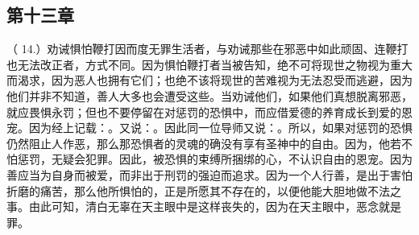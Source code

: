 
\subsection{第十三章}

\par

（ 14.）劝诫惧怕鞭打因而度无罪生活者，与劝诫那些在邪恶中如此顽固、连鞭打也无法改正者，方式不同。因为惧怕鞭打者当被告知，绝不可将现世之物视为重大而渴求，因为恶人也拥有它们；也绝不该将现世的苦难视为无法忍受而逃避，因为他们并非不知道，善人大多也会遭受这些。当劝诫他们，如果他们真想脱离邪恶，就应畏惧永罚；但也不要停留在对惩罚的恐惧中，而应借爱德的养育成长到爱的恩宠。因为经上记载：。又说：。因此同一位导师又说：。所以，如果对惩罚的恐惧仍然阻止人作恶，那么那恐惧者的灵魂的确没有享有圣神中的自由。因为，他若不怕惩罚，无疑会犯罪。因此，被恐惧的束缚所捆绑的心，不认识自由的恩宠。因为善应当为自身而被爱，而非出于刑罚的强迫而追求。因为一个人行善，是出于害怕折磨的痛苦，那么他所惧怕的，正是所愿其不存在的，以便他能大胆地做不法之事。由此可知，清白无辜在天主眼中是这样丧失的，因为在天主眼中，恶念就是罪。\par

